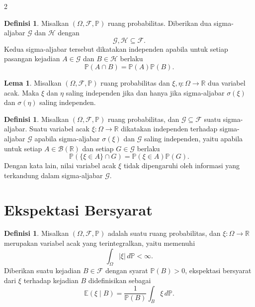\documentclass[a4paper,extrafontsizes, 9pt]{memoir}
\theoremstyle{definition}
\newtheorem{definisi}[kalstok]{Definisi}
\newtheorem{lemma}[kalstok]{Lema}
\theoremstyle{plain}
\theoremstyle{remark}
\begin{document}
\begin{multicols}{2}
  \begin{definisi}
    Misalkan $(\Omega,\mathcal{F},\mathbb{P})$ ruang probabilitas.
    Diberikan dua sigma-aljabar $\mathcal{G}$ dan $\mathcal{H}$ dengan
    \[\mathcal{G},\mathcal{H}\subseteq\mathcal{F}.\]
    Kedua sigma-aljabar tersebut dikatakan independen apabila untuk setiap pasangan kejadian
    $A\in\mathcal{G}$ dan $B\in\mathcal{H}$ berlaku
    \[\mathbb{P}(A\cap B)=\mathbb{P}(A)\mathbb{P}(B).\]
  \end{definisi}

  \begin{lemma}
    Misalkan $(\Omega,\mathcal{F},\mathbb{P})$ ruang probabilitas dan
    $\xi,\eta:\Omega\to\mathbb{R}$ dua variabel acak.
    Maka $\xi$ dan $\eta$ saling independen jika dan hanya jika sigma-aljabar
    $\sigma(\xi)$ dan $\sigma(\eta)$ saling independen.
  \end{lemma}

  \begin{definisi}
    Misalkan $(\Omega,\mathcal{F},\mathbb{P})$ ruang probabilitas, dan
    $\mathcal{G}\subseteq\mathcal{F}$ suatu sigma-aljabar.
    Suatu variabel acak $\xi:\Omega\to\mathbb{R}$ dikatakan independen terhadap sigma-aljabar
    $\mathcal{G}$ apabila sigma-aljabar $\sigma(\xi)$ dan $\mathcal{G}$ saling independen,
    yaitu apabila untuk setiap $A\in\mathcal{B}(\mathbb{R})$ dan setiap $G\in\mathcal{G}$ berlaku
    \[\mathbb{P}(\{\xi\in A\}\cap G)=\mathbb{P}(\xi\in A)\mathbb{P}(G).\]
    Dengan kata lain, nilai variabel acak $\xi$ tidak dipengaruhi oleh informasi yang terkandung
    dalam sigma-aljabar $\mathcal{G}$.
  \end{definisi}

  \section{\small Ekspektasi Bersyarat}

  \begin{definisi}
    Misalkan $(\Omega,\mathcal{F},\mathbb{P})$ adalah suatu ruang probabilitas, dan
    $\xi:\Omega\to\mathbb{R}$ merupakan variabel acak yang terintegralkan, yaitu memenuhi
    \[\int_{\Omega}|\xi|\,d\mathbb{P}<\infty.\]
    Diberikan suatu kejadian $B\in\mathcal{F}$ dengan syarat $\mathbb{P}(B)>0$, ekspektasi
    bersyarat dari $\xi$ terhadap kejadian $B$ didefinisikan sebagai
    \[\mathbb{E}(\xi\mid B)=\frac{1}{\mathbb{P}(B)}\int_B \xi\,d\mathbb{P}.\]
  \end{definisi}


\end{multicols}
\end{document}
